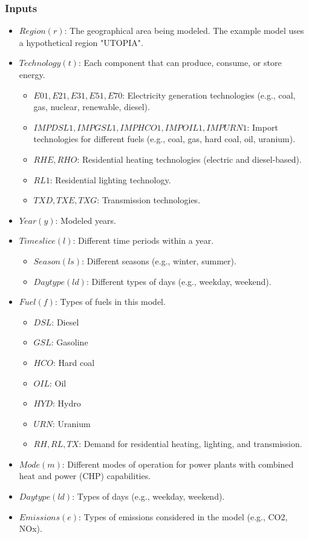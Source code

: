 \documentclass[11pt]{article}
\begin{document}
\subsubsection{Inputs}
\begin{itemize}
    \item $Region(r)$: The geographical area being modeled. The example model uses a hypothetical region "UTOPIA".
    \item $Technology(t)$: Each component that can produce, consume, or store energy.
    \begin{itemize}
        \item $E01, E21, E31, E51, E70$: Electricity generation technologies (e.g., coal, gas, nuclear, renewable, diesel).
        \item $IMPDSL1, IMPGSL1, IMPHCO1, IMPOIL1, IMPURN1$: Import technologies for different fuels (e.g., coal, gas, hard coal, oil, uranium).
        \item $RHE, RHO$: Residential heating technologies (electric and diesel-based).
        \item $RL1$: Residential lighting technology.
        \item $TXD, TXE, TXG$: Transmission technologies.
    \end{itemize}
    \item $Year(y)$: Modeled years.
    \item $Timeslice(l)$: Different time periods within a year.
    \begin{itemize}
        \item $Season(ls)$: Different seasons (e.g., winter, summer).
        \item $Daytype(ld)$: Different types of days (e.g., weekday, weekend).
    \end{itemize}
    \item $Fuel(f)$: Types of fuels in this model.
    \begin{itemize}
        \item $DSL$: Diesel
        \item $GSL$: Gasoline
        \item $HCO$: Hard coal
        \item $OIL$: Oil
        \item $HYD$: Hydro
        \item $URN$: Uranium
        \item $RH, RL, TX$: Demand for residential heating, lighting, and transmission.
    \end{itemize}
    \item $Mode(m)$: Different modes of operation for power plants with combined heat and power (CHP) capabilities.
    \item $Daytype(ld)$: Types of days (e.g., weekday, weekend).
    \item $Emissions(e)$: Types of emissions considered in the model (e.g., CO2, NOx).
\end{itemize}
\end{document}
